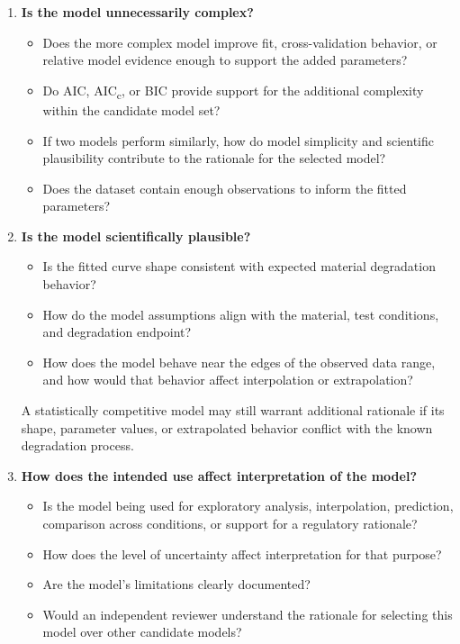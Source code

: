 \begin{enumerate}
    A model can have a fitted curve that closely follows the observed data while still having uncertain or coupled parameters. In that case, the curve may be useful for empirical description within the observed data range. Interpret individual parameter values cautiously.

    \item \textbf{Is the model unnecessarily complex?}
    \begin{itemize}
        \item Does the more complex model improve fit, cross-validation behavior, or relative model evidence enough to support the added parameters?
        \item Do AIC, AIC\textsubscript{c}, or BIC provide support for the additional complexity within the candidate model set?
        \item If two models perform similarly, how do model simplicity and scientific plausibility contribute to the rationale for the selected model?
        \item Does the dataset contain enough observations to inform the fitted parameters?
    \end{itemize}

    \item \textbf{Is the model scientifically plausible?}
    \begin{itemize}
        \item Is the fitted curve shape consistent with expected material degradation behavior?
        \item How do the model assumptions align with the material, test conditions, and degradation endpoint?
        \item How does the model behave near the edges of the observed data range, and how would that behavior affect interpolation or extrapolation?
    \end{itemize}

    A statistically competitive model may still warrant additional rationale if its shape, parameter values, or extrapolated behavior conflict with the known degradation process.

    \item \textbf{How does the intended use affect interpretation of the model?}
    \begin{itemize}
        \item Is the model being used for exploratory analysis, interpolation, prediction, comparison across conditions, or support for a regulatory rationale?
        \item How does the level of uncertainty affect interpretation for that purpose?
        \item Are the model's limitations clearly documented?
        \item Would an independent reviewer understand the rationale for selecting this model over other candidate models?
    \end{itemize}
\end{enumerate}

